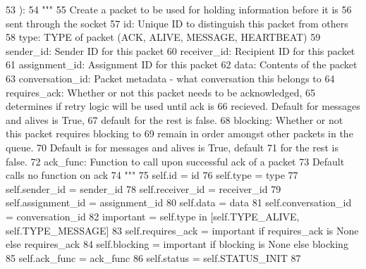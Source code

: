 \begin{DoxyCode}
53     ):
54         \textcolor{stringliteral}{"""}
55 \textcolor{stringliteral}{        Create a packet to be used for holding information before it is}
56 \textcolor{stringliteral}{        sent through the socket}
57 \textcolor{stringliteral}{        id:               Unique ID to distinguish this packet from others}
58 \textcolor{stringliteral}{        type:             TYPE of packet (ACK, ALIVE, MESSAGE, HEARTBEAT)}
59 \textcolor{stringliteral}{        sender\_id:        Sender ID for this packet}
60 \textcolor{stringliteral}{        receiver\_id:      Recipient ID for this packet}
61 \textcolor{stringliteral}{        assignment\_id:    Assignment ID for this packet}
62 \textcolor{stringliteral}{        data:             Contents of the packet}
63 \textcolor{stringliteral}{        conversation\_id:  Packet metadata - what conversation this belongs to}
64 \textcolor{stringliteral}{        requires\_ack:     Whether or not this packet needs to be acknowledged,}
65 \textcolor{stringliteral}{                           determines if retry logic will be used until ack is}
66 \textcolor{stringliteral}{                           recieved. Default for messages and alives is True,}
67 \textcolor{stringliteral}{                           default for the rest is false.}
68 \textcolor{stringliteral}{        blocking:         Whether or not this packet requires blocking to}
69 \textcolor{stringliteral}{                           remain in order amongst other packets in the queue.}
70 \textcolor{stringliteral}{                           Default is for messages and alives is True, default}
71 \textcolor{stringliteral}{                           for the rest is false.}
72 \textcolor{stringliteral}{        ack\_func:         Function to call upon successful ack of a packet}
73 \textcolor{stringliteral}{                           Default calls no function on ack}
74 \textcolor{stringliteral}{        """}
75         self.id = id
76         self.type = type
77         self.sender\_id = sender\_id
78         self.receiver\_id = receiver\_id
79         self.assignment\_id = assignment\_id
80         self.data = data
81         self.conversation\_id = conversation\_id
82         important = self.type \textcolor{keywordflow}{in} [self.TYPE\_ALIVE, self.TYPE\_MESSAGE]
83         self.requires\_ack = important \textcolor{keywordflow}{if} requires\_ack \textcolor{keywordflow}{is} \textcolor{keywordtype}{None} \textcolor{keywordflow}{else} requires\_ack
84         self.blocking = important \textcolor{keywordflow}{if} blocking \textcolor{keywordflow}{is} \textcolor{keywordtype}{None} \textcolor{keywordflow}{else} blocking
85         self.ack\_func = ack\_func
86         self.status = self.STATUS\_INIT
87 
\end{DoxyCode}


